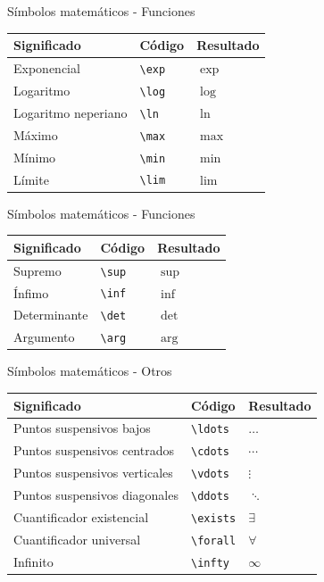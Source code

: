 \documentclass[
  ignorenonframetext,
  aspectratio=169]{beamer}
\begin{document}
\begin{frame}[fragile]{Símbolos matemáticos - Funciones}
\protect\hypertarget{suxedmbolos-matemuxe1ticos---funciones-1}{}
\begin{longtable}[]{@{}lll@{}}
\toprule()
Significado & Código & Resultado \\
\midrule()
\endhead
Exponencial & \texttt{\textbackslash{}exp} & \(\exp\) \\
Logaritmo & \texttt{\textbackslash{}log} & \(\log\) \\
Logaritmo neperiano & \texttt{\textbackslash{}ln} & \(\ln\) \\
Máximo & \texttt{\textbackslash{}max} & \(\max\) \\
Mínimo & \texttt{\textbackslash{}min} & \(\min\) \\
Límite & \texttt{\textbackslash{}lim} & \(\lim\) \\
\bottomrule()
\end{longtable}
\end{frame}

\begin{frame}[fragile]{Símbolos matemáticos - Funciones}
\protect\hypertarget{suxedmbolos-matemuxe1ticos---funciones-2}{}
\begin{longtable}[]{@{}lll@{}}
\toprule()
Significado & Código & Resultado \\
\midrule()
\endhead
Supremo & \texttt{\textbackslash{}sup} & \(\sup\) \\
Ínfimo & \texttt{\textbackslash{}inf} & \(\inf\) \\
Determinante & \texttt{\textbackslash{}det} & \(\det\) \\
Argumento & \texttt{\textbackslash{}arg} & \(\arg\) \\
\bottomrule()
\end{longtable}
\end{frame}

\begin{frame}[fragile]{Símbolos matemáticos - Otros}
\protect\hypertarget{suxedmbolos-matemuxe1ticos---otros}{}
\begin{longtable}[]{@{}lll@{}}
\toprule()
Significado & Código & Resultado \\
\midrule()
\endhead
Puntos suspensivos bajos & \texttt{\textbackslash{}ldots} &
\(\ldots\) \\
Puntos suspensivos centrados & \texttt{\textbackslash{}cdots} &
\(\cdots\) \\
Puntos suspensivos verticales & \texttt{\textbackslash{}vdots} &
\(\vdots\) \\
Puntos suspensivos diagonales & \texttt{\textbackslash{}ddots} &
\(\ddots\) \\
Cuantificador existencial & \texttt{\textbackslash{}exists} &
\(\exists\) \\
Cuantificador universal & \texttt{\textbackslash{}forall} &
\(\forall\) \\
Infinito & \texttt{\textbackslash{}infty} & \(\infty\) \\
\bottomrule()
\end{longtable}
\end{frame}
\end{document}
